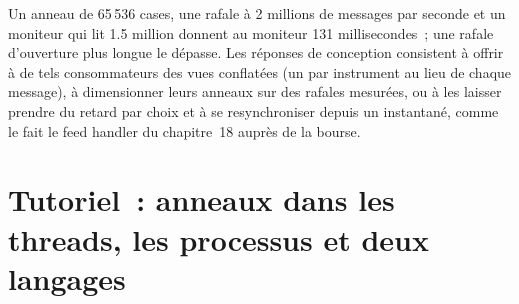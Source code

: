 Un anneau de 65\,536 cases, une rafale à 2 millions de messages par seconde et un moniteur qui lit 1.5 million donnent au moniteur 131
millisecondes~; une rafale d'ouverture plus longue le dépasse. Les réponses de conception consistent à offrir à de tels consommateurs des vues
conflatées (un  par instrument au lieu de chaque message), à dimensionner leurs anneaux sur des rafales mesurées, ou à les laisser
prendre du retard par choix et à se resynchroniser depuis un instantané, comme le fait le feed handler du chapitre~18 auprès de la bourse.

\section{Tutoriel~: anneaux dans les threads, les processus et deux langages}\label{tut:ll:queues-ring-buffers-and-shared-memory:tut}

